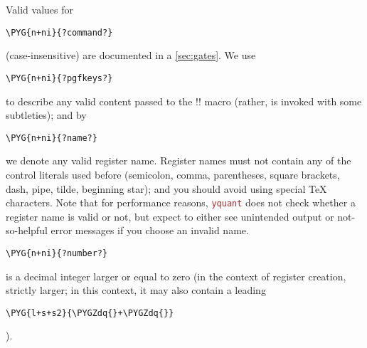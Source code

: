 \documentclass{scrartcl}
\def\pkg#1{\textcolor{brown}{\texttt{#1}}}
\def\texlink{\link\tex}
\def\Yquant{\pkg{yquant}}
\begin{document}
         Valid values for
         \begingroup%
         \begin{BVerbatim}[commandchars=\\\{\}]
\PYG{n+ni}{?command?}
         \end{BVerbatim}
         \space (case\hyp insensitive) are documented in a \cref{sec:gates}.
         We use
         \begin{BVerbatim}[commandchars=\\\{\}]
\PYG{n+ni}{?pgfkeys?}
         \end{BVerbatim}
         \space to describe any valid content passed to the \tex!\pgfkeys! macro (rather, \texlink{\yquantset} is invoked with some subtleties); and by
         \begin{BVerbatim}[commandchars=\\\{\}]
\PYG{n+ni}{?name?}
         \end{BVerbatim}
         \space we denote any valid register name.
         Register names must not contain any of the control literals used before (semicolon, comma, parentheses, square brackets, dash, pipe, tilde, beginning star); and you should avoid using special \TeX{} characters.
         Note that for performance reasons, \Yquant{} does not check whether a register name is valid or not, but expect to either see unintended output or not\hyp so\hyp helpful error messages if you choose an invalid name.
         \begin{BVerbatim}[commandchars=\\\{\}]
\PYG{n+ni}{?number?}
         \end{BVerbatim}
         \space is a decimal integer larger or equal to zero (in the context of register creation, strictly larger; in this context, it may also contain a leading
         \begin{BVerbatim}[commandchars=\\\{\}]
\PYG{l+s+s2}{\PYGZdq{}+\PYGZdq{}}
         \end{BVerbatim}
         ).\endgroup
\end{document}
